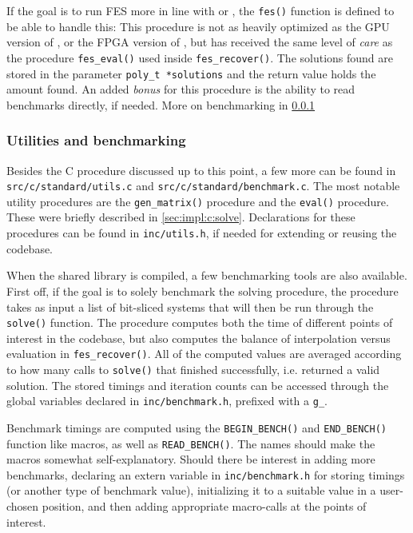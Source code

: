 If the goal is to run FES more in line with \cite{cryptoeprint:2013/436} or \cite{ches-2010-23990}, the \texttt{fes()} function is defined to be able to handle this:
This procedure is not as heavily optimized as the GPU version of \cite{ches-2010-23990}, or the FPGA version of \cite{cryptoeprint:2013/436}, but has received the same level of \textit{care} as the procedure \texttt{fes\_eval()} used inside \texttt{fes\_recover()}. The solutions found are stored in the parameter \texttt{poly\_t *solutions} and the return value holds the amount found. An added \textit{bonus} for this procedure is the ability to read benchmarks directly, if needed. More on benchmarking in \cref{sec:impl:c:util_bench}

\subsubsection{Utilities and benchmarking} \label{sec:impl:c:util_bench}
Besides the C procedure discussed up to this point, a few more can be found in \texttt{src/c/standard/utils.c} and \texttt{src/c/standard/benchmark.c}. The most notable utility procedures are the \texttt{gen\_matrix()} procedure and the \texttt{eval()} procedure. These were briefly described in \cref{sec:impl:c:solve}. Declarations for these procedures can be found in \texttt{inc/utils.h}, if needed for extending or reusing the codebase.

When the shared library is compiled, a few benchmarking tools are also available. First off, if the goal is to solely benchmark the solving procedure, the procedure 
takes as input a list of bit-sliced systems that will then be run through the \texttt{solve()} function. The procedure computes both the time of different points of interest in the codebase, but also computes the balance of interpolation versus evaluation in \texttt{fes\_recover()}. All of the computed values are averaged according to how many calls to \texttt{solve()} that finished successfully, i.e. returned a valid solution. The stored timings and iteration counts can be accessed through the global variables declared in \texttt{inc/benchmark.h}, prefixed with a \texttt{g\_}. 

Benchmark timings are computed using the \texttt{BEGIN\_BENCH()} and \texttt{END\_BENCH()} function like macros, as well as \texttt{READ\_BENCH()}. The names should make the macros somewhat self-explanatory. Should there be interest in adding more benchmarks, declaring an extern variable in \texttt{inc/benchmark.h} for storing timings (or another type of benchmark value), initializing it to a suitable value in a user-chosen position, and then adding appropriate macro-calls at the points of interest.
